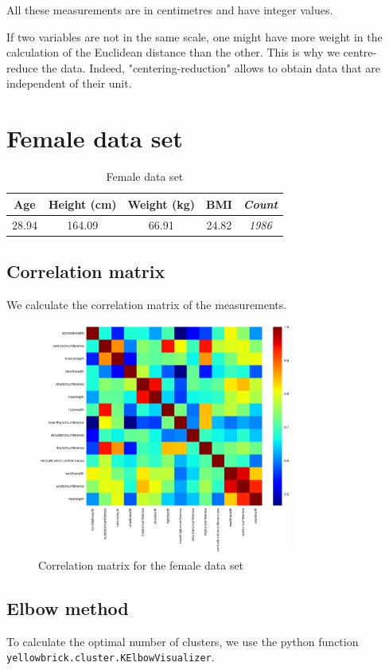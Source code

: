 \documentclass[12pt,a4paper,openany,UKenglish]{scrreprt}
\begin{document}
All these measurements are in centimetres and have integer values.

If two variables are not in the same scale, one might have more weight in the calculation of the Euclidean distance than the other. This is why we centre-reduce the data. Indeed, "centering-reduction" allows to obtain data that are independent of their unit.

\section{Female data set}
\vspace{-8mm}
\begin{table}[H]
	\caption{Female data set}
	\centering
	\begin{tabular}{|cccc|c|}
		\hline
		Age   & Height (cm) & Weight (kg) & BMI   & \textit{Count} \\
		\hline
		28.94 & 164.09      & 66.91       & 24.82 & \textit{1986}  \\
		\hline
	\end{tabular}
\end{table}

\subsection{Correlation matrix}
We calculate the correlation matrix of the measurements.
\begin{figure}[H]
	\centering
	\caption{Correlation matrix for the female data set}
	\includegraphics[width=0.75\textwidth]{../Images/FCorr.png}
\end{figure}

\subsection{Elbow method}
To calculate the optimal number of clusters, we use the python function \\
\texttt{yellowbrick.cluster.KElbowVisualizer}.
\end{document}
